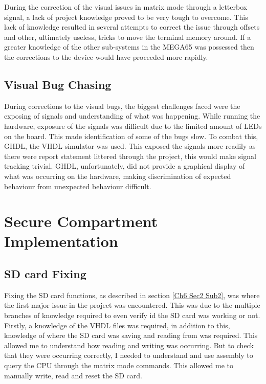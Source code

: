 During the correction of the visual issues in matrix mode through a letterbox signal, a lack of project knowledge proved to be very tough to overcome. This lack of knowledge resulted in several attempts to correct the issue through offsets and other, ultimately useless, tricks to move the terminal memory around. If a greater knowledge of the other sub-systems in the MEGA65 was possessed then the corrections to the device would have proceeded more rapidly.

\subsection{Visual Bug Chasing}

\label{Ch7 Sec1 Sub4}

During corrections to the visual bugs, the biggest challenges faced were the exposing of signals and understanding of what was happening. While running the hardware, exposure of the signals was difficult due to the limited amount of LEDs on the board. This made identification of some of the bugs slow. To combat this, GHDL, the VHDL simulator was used. This exposed the signals more readily as there were report statement littered through the project, this would make signal tracking trivial. GHDL, unfortunately, did not provide a graphical display of what was occurring on the hardware, making discrimination of expected behaviour from unexpected behaviour difficult.


\section{Secure Compartment Implementation}

\label{Ch7 Sec2}

\subsection{SD card Fixing}

\label{Ch7 Sec2 Sub1}

Fixing the SD card functions, as described in section \ref{Ch6 Sec2 Sub2}, was where the first major issue in the project was encountered. This was due to the multiple branches of knowledge required to even verify id the SD card was working or not. Firstly, a knowledge of the VHDL files was required, in addition to this, knowledge of where the SD card was saving and reading from was required. This allowed me to understand how reading and writing was occurring. But to check that they were occurring correctly, I needed to understand and use assembly to query the CPU through the matrix mode commands. This allowed me to manually write, read and reset the SD card.

